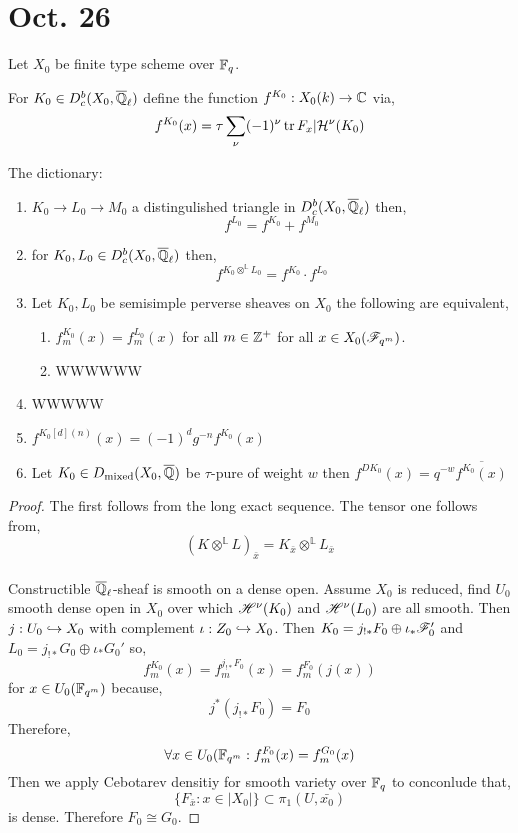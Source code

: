 \documentclass[12pt]{article}
\begin{document}
\section{Oct. 26}

Let $X_0$ be finite type scheme over $\mathbb{F}_q$.

\begin{defn}
For $K_0 \in D_c^b(X_0, \overline{\mathbb{Q}}_\ell)$ define the function $f^{K_0} : X_0(k) \to \mathbb{C}$ via,
\[ f^{K_0}(x) = \tau \sum_{\nu} (-1)^\nu \operatorname{\mathrm{tr}}{F_x | \mathcal{H}^\nu(K_0)} \] 
\end{defn}

\begin{thm}
The dictionary:
\begin{enumerate}
\item $K_0 \to L_0 \to M_0$ a distingulished triangle in $D^b_c(X_0, \overline{\mathbb{Q}}_\ell)$ then,
\[ f^{L_0} = f^{K_0} + f^{M_0} \]
\item for $K_0, L_0 \in D^b_c(X_0, \overline{\mathbb{Q}}_\ell)$ then,
\[ f^{K_0 \otimes^{\mathbb{L}} L_0} = f^{K_0} \cdot f^{L_0} \]
\item Let $K_0, L_0$ be semisimple perverse sheaves on $X_0$ the following are equivalent,
\begin{enumerate}
\item $f_m^{K_0}(x) = f^{L_0}_m(x)$ for all $m \in \mathbb{Z}^+$ for all $x \in X_0(\mathscr{F}_{q^m})$.
\item WWWWWW
\end{enumerate}
\item WWWWW

\item $f^{K_0[d](n)}(x) = (-1)^d g^{-n} f^{K_0}(x)$ 

\item Let $K_0 \in D_{\text{mixed}}(X_0, \overline{\mathbb{Q}})$ be $\tau$-pure of weight $w$ then $f^{DK_0}(x) = q^{-w} \overline{f^{K_0}(x)}$
\end{enumerate}
\end{thm}


\begin{proof}
The first follows from the long exact sequence. The tensor one follows from,
\[ (K \otimes^{\mathbb{L}} L)_{\bar{x}} = K_{\bar{x}} \otimes^{\mathbb{L}} L_{\bar{x}} \]
\bigskip\\
Constructible $\overline{\mathbb{Q}}_\ell$-sheaf is smooth on a dense open. Assume $X_0$ is reduced, find $U_0$ smooth dense open in $X_0$ over which $\mathscr{H}^\nu(K_0)$ and $\mathscr{H}^\nu(L_0)$ are all smooth. Then $j : U_0 \hookrightarrow X_0$ with complement $\iota : Z_0 \hookrightarrow X_0$. Then $K_0 = j_{!*} F_0 \oplus \iota_* \mathscr{F}_0'$ and $L_0 = j_{!*} G_0 \oplus \iota_* G_0'$ so,
\[ f^{K_0}_m(x) = f_m^{j_{!*} F_0}(x) = f_m^{F_0}(j(x)) \]
for $x \in U_0(\mathbb{F}_{q^m})$ because,
\[ j^* (j_{!*} F_0) = F_0 \]
Therefore,
\[ \forall x \in U_0(\mathbb{F}_{q^m} : f_m^{F_0}(x) = f_m^{G_0}(x) \]
Then we apply Cebotarev densitiy for smooth variety over $\mathbb{F}_q$ to conconlude that,
\[ \{ F_{\bar{x}} : x \in |X_0| \} \subset \pi_1(U, \bar{x_0}) \]
is dense. Therefore $F_0 \cong G_0$. 
\end{proof}
\end{document}

